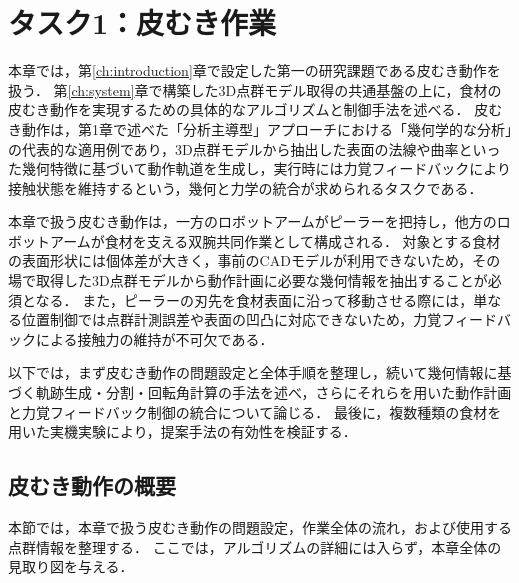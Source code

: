\chapter{タスク1：皮むき作業}
\label{ch:peeling}

本章では，第\ref{ch:introduction}章で設定した第一の研究課題である皮むき動作を扱う．
第\ref{ch:system}章で構築した3D点群モデル取得の共通基盤の上に，食材の皮むき動作を実現するための具体的なアルゴリズムと制御手法を述べる．
皮むき動作は，第1章で述べた「分析主導型」アプローチにおける「幾何学的な分析」の代表的な適用例であり，3D点群モデルから抽出した表面の法線や曲率といった幾何特徴に基づいて動作軌道を生成し，実行時には力覚フィードバックにより接触状態を維持するという，幾何と力学の統合が求められるタスクである．

本章で扱う皮むき動作は，一方のロボットアームがピーラーを把持し，他方のロボットアームが食材を支える双腕共同作業として構成される．
対象とする食材の表面形状には個体差が大きく，事前のCADモデルが利用できないため，その場で取得した3D点群モデルから動作計画に必要な幾何情報を抽出することが必須となる．
また，ピーラーの刃先を食材表面に沿って移動させる際には，単なる位置制御では点群計測誤差や表面の凹凸に対応できないため，力覚フィードバックによる接触力の維持が不可欠である．

以下では，まず皮むき動作の問題設定と全体手順を整理し，続いて幾何情報に基づく軌跡生成・分割・回転角計算の手法を述べ，さらにそれらを用いた動作計画と力覚フィードバック制御の統合について論じる．
最後に，複数種類の食材を用いた実機実験により，提案手法の有効性を検証する．


\section{皮むき動作の概要}  %
\label{sec:peeling_phase_overview}

本節では，本章で扱う皮むき動作の問題設定，作業全体の流れ，および使用する点群情報を整理する．
ここでは，アルゴリズムの詳細には入らず，本章全体の見取り図を与える．


